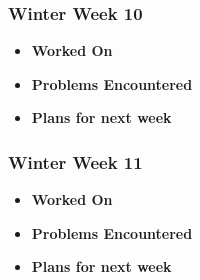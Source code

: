 \documentclass[compsoc,draftclsnofoot,onecolumn,10pt]{IEEEtran}
\begin{document}
\subsubsection{Winter Week 10}
\begin{itemize}
    \item {\textbf{Worked On}}
    \begin{itemize}
        
    \end{itemize}

    \item {\textbf{Problems Encountered}}
    \begin{itemize}
        
    \end{itemize}

    \item{\textbf{Plans for next week}}
    \begin{itemize}
        
    \end{itemize}

\end{itemize}

\subsubsection{Winter Week 11}
\begin{itemize}
    \item {\textbf{Worked On}}
    \begin{itemize}
        
    \end{itemize}

    \item {\textbf{Problems Encountered}}
    \begin{itemize}
        
    \end{itemize}

    \item{\textbf{Plans for next week}}
    \begin{itemize}
        
    \end{itemize}

\end{itemize}
\end{document}
